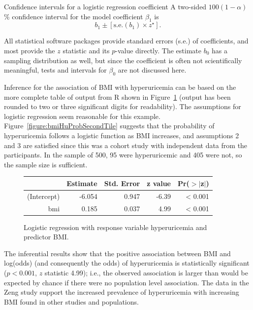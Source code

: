 \begin{onebox}{Confidence intervals for a logistic regression coefficient}
A two-sided $100(1 - \alpha)$\% confidence interval for the model coefficient $\beta_1$ is
\[
  b_1 \pm [{\textrm{s.e.}(b_1)} \times z^\star].
\]
\end{onebox}

All statistical software packages provide standard errors (s.e.) of coefficients, and most provide the $z$ statistic and its $p$-value directly.  The estimate $b_0$ has a sampling distribution as well, but since the coefficient is often not scientifically meaningful, tests and intervals for $\beta_0$ are not discussed here.

Inference for the association of BMI with hyperuricemia can be based on the more complete table of output from \textsf{R} shown in Figure~\ref{figure:bmiHyperuricemiaLogReg} (output has been rounded to two or three significant digits for readability).  The assumptions for logistic regression seem reasonable for this example. Figure~\ref{figure:bmiHuProbSecondTile} suggests that the probability of hyperuricemia follows a logistic function as BMI increases, and assumptions 2 and 3 are satisfied since this was a cohort study with independent data from the participants. In the sample of 500, 95 were hyperuricemic and 405 were not, so the sample size is sufficient.

\begin{figure}[ht]
\centering
\begin{tabular}{rrrrr}
  \hline
 & Estimate & Std. Error & z value & Pr($>$$|$z$|$) \\
  \hline
(Intercept) & -6.054 & 0.947 & -6.39 & < 0.001 \\
  bmi & 0.185 & 0.037 & 4.99 & < 0.001 \\
   \hline
\end{tabular}
\caption{Logistic regression with response variable hyperuricemia
        and predictor BMI.}
\label{figure:bmiHyperuricemiaLogReg}
\end{figure}

The inferential results show that the positive association between BMI and log(odds) (and consequently the odds) of hyperuricemia is statistically significant ($p< 0.001$, $z$ statistic 4.99); i.e., the observed association is larger than would be expected by chance if there were no population level association.  The data in the Zeng study support the increased prevalence of hyperuricemia with increasing BMI found in other studies and populations.

